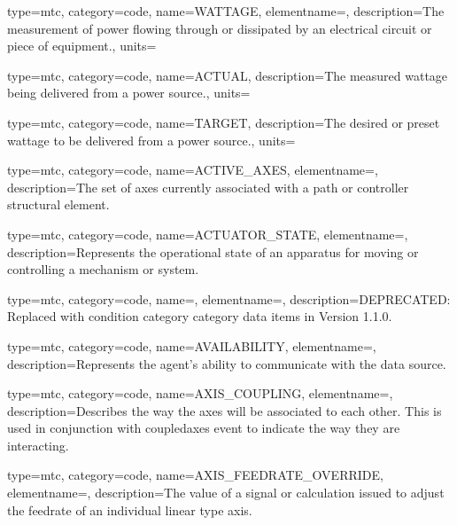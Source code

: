 {
  type=mtc,
  category=code,
  name={WATTAGE},
  elementname=,
  description={The measurement of power flowing through or dissipated by an electrical circuit or piece of equipment.},
  units=
}

{
  type=mtc,
  category=code,
  name={ACTUAL},
  description={The measured wattage being delivered from a power source.},
  units=
}

{
  type=mtc,
  category=code,
  name={TARGET},
  description={The desired or preset wattage to be delivered from a power source.},
  units=
}


{
  type=mtc,
  category=code,
  name={ACTIVE\_AXES},
  elementname=,
  description={The set of axes currently associated with a \gls{path} or \gls{controller} \gls{structural element}.}
}

{
  type=mtc,
  category=code,
  name={ACTUATOR\_STATE},
  elementname=,
  description={Represents the operational state of an apparatus for moving or controlling a mechanism or system.}
}

{
  type=mtc,
  category=code,
  name=,
  elementname=,
  description={DEPRECATED: Replaced with \gls{condition category} category data items in Version 1.1.0.}
}

{
  type=mtc,
  category=code,
  name={AVAILABILITY},
  elementname=,
  description={Represents the \gls{agent}’s ability to communicate with the data source.}
}

{
  type=mtc,
  category=code,
  name={AXIS\_COUPLING},
  elementname=,
  description={Describes the way the axes will be associated to each other. This is used in conjunction with \gls{coupledaxes event} to indicate the way they are interacting.}
}

{
  type=mtc,
  category=code,
  name={AXIS\_FEEDRATE\_OVERRIDE},
  elementname=,
  description={The value of a signal or calculation issued to adjust the feedrate of an individual linear type axis.}
}

